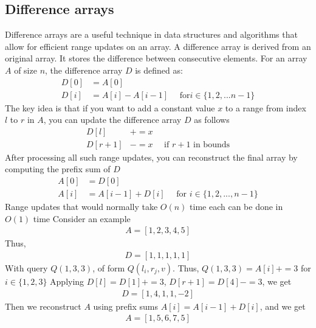 \documentclass{report}
\begin{document}
    \subsection{Difference arrays}
    \bigbreak \noindent 
    Difference arrays are a useful technique in data structures and algorithms that allow for efficient range updates on an array.
    \bigbreak \noindent 
    A difference array is derived from an original array. It stores the difference between consecutive elements. For an array $A$ of size $n$, the difference array $D$ is defined as:
    \begin{align*}
        D[0] &= A[0] \\
        D[i] &= A[i] - A[i-1]  \quad \text{ for} i \in \{1,2,...n-1\}
    \end{align*}
    \bigbreak \noindent 
    The key idea is that if you want to add a constant value $x$ to a range from index $l$ to $r$ in $A$, you can update the difference array $D$ as follows
    \begin{align*}
        D[l] &+= x \\
        D[r+1] &-= x \quad \text{ if $r+1$ in bounds}
    \end{align*}
    After processing all such range updates, you can reconstruct the final array by computing the prefix sum of $D$
    \begin{align*}
        A[0] &= D[0] \\
        A[i] &= A[i-1] + D[i] \quad \text{ for } i\in \{1,2,...,n-1\} 
    \end{align*}
    \bigbreak \noindent 
    Range updates that would normally take $O(n)$ time each can be done in $O(1)$ time
    \bigbreak \noindent 
    Consider an example
    \begin{align*}
        A = [1,2,3,4,5]
    \end{align*}
    Thus,
    \begin{align*}
        D = [1,1,1,1,1]
    \end{align*}
    \bigbreak \noindent 
    With query $Q(1,3,3)$, of form $Q(l_{i}, r_{j}, v)$. Thus, $Q(1,3,3)  = A[i]+=3$ for $i\in \{1,2,3\}$
    \bigbreak \noindent 
    Applying $D[l] = D[1] +=3$, $D[r+1]  = D[4]-=3$, we get
    \begin{align*}
        D = [1,4,1,1,-2]
    \end{align*}
    Then we reconstruct $A$ using prefix sums $A[i] = A[i-1] + D[i]$, and we get
    \begin{align*}
        A = [1,5,6,7,5] 
    \end{align*}
\end{document}
